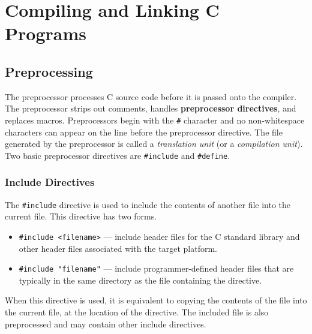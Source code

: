 \documentclass{article}
\begin{document}
\section{Compiling and Linking C Programs}
\subsection{Preprocessing}
The preprocessor processes C source code before it is passed onto the
compiler. The preprocessor strips out comments, handles
\textbf{preprocessor directives}, and replaces macros. Preprocessors
begin with the \texttt{#} character and no non-whitespace
characters can appear on the line before the preprocessor directive.
The file generated by the preprocessor is called a \textit{translation
unit} (or a \textit{compilation unit}). Two basic preprocessor
directives are \texttt{#include} and \texttt{#define}.
\subsubsection{Include Directives}
The \texttt{#include} directive is used to include the contents
of another file into the current file. This directive has two forms.
\begin{itemize}
    \item \texttt{#include <filename>} --- include header files for the C standard library and other header files associated with the target platform.
    \item \texttt{#include "filename"} --- include programmer-defined header files that are typically in the same directory as the file containing the directive.
\end{itemize}
When this directive is used, it is equivalent to copying the contents of the file into the current file,
at the location of the directive. The included file is also preprocessed and may contain other include directives.
\end{document}
